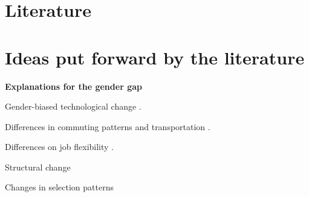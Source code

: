 \section{Literature}
\section{Ideas put forward by the literature}
\textbf{Explanations for the gender gap}
\bitem
	\item Gender-biased technological change \citep{Black2010}.
	\item Differences in commuting patterns and transportation \citep{Black2014,Liu2020}.
	\item Differences on job flexibility \citep{Goldin2014}.
	\item Structural change \citep{Olivetti2014,Olivetti2016}
	\item Changes in selection patterns \citep{Mulligan2008}
\eitem